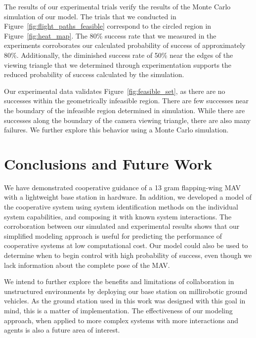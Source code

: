 \documentclass{aamas2013}
\begin{document}
The results of our experimental trials verify the results of the Monte Carlo
simulation of our model. The trials that we conducted in
Figure~\ref{fig:flight_paths_feasible} correspond to the circled region in
Figure~\ref{fig:heat_map}. The 80\% success rate that we measured in the
experiments corroborates our calculated probability of success of
approximately 80\%. Additionally, the diminished success rate of 50\% near the
edges of the viewing triangle that we determined through experimentation
supports the reduced probability of success calculated by the simulation. 

Our experimental data validates Figure~\ref{fig:feasible_set}, as there are 
no successes within the geometrically infeasible region. There are few 
successes near the boundary of the infeasible region determined in 
simulation. While there are successes along the boundary of the camera 
viewing triangle, there are also many failures. We further explore this 
behavior using a Monte Carlo simulation.

\section{Conclusions and Future Work}
We have demonstrated cooperative guidance of a 13 gram flapping-wing MAV with a
lightweight base station in hardware. In addition, we developed a model of the
cooperative system using system identification methods on the individual system capabilities, and composing
it with known system interactions. The corroboration between our simulated and
experimental results shows that our simplified modeling approach is useful for 
predicting the performance of cooperative systems at low computational cost. Our model could also be used to determine when to begin control with high probability of success, even though we lack information about the complete pose of the MAV.

We intend to further explore the benefits and limitations of collaboration in
unstructured environments by deploying our base station on millirobotic ground
vehicles. As the ground station used in this work was designed with this goal
in mind, this is a matter of implementation. The effectiveness of our modeling
approach, when applied to more complex systems with more interactions and 
agents is also a future area of interest. 

\end{document}
